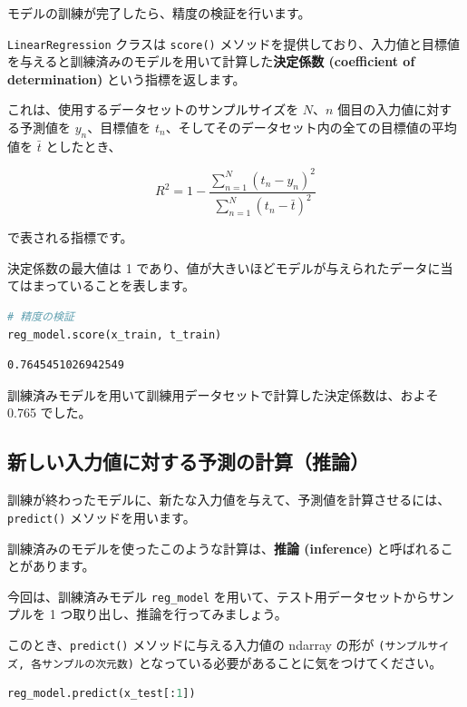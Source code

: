 モデルの訓練が完了したら、精度の検証を行います。

\texttt{LinearRegression} クラスは \texttt{score()} メソッドを提供しており、入力値と目標値を与えると訓練済みのモデルを用いて計算した\textbf{決定係数 (coefficient of determination)} という指標を返します。


これは、使用するデータセットのサンプルサイズを $N$、$n$ 個目の入力値に対する予測値を $y_{n}$、目標値を $t_n$、そしてそのデータセット内の全ての目標値の平均値を $\bar{t}$ としたとき、


\[
R^{2} = 1 - \dfrac{\sum_{n=1}^{N}\left( t_{n} - y_{n} \right)^{2}}{\sum_{n=1}^{N}\left( t_{n} - \bar{t} \right)^{2}}
\]


で表される指標です。


決定係数の最大値は 1 であり、値が大きいほどモデルが与えられたデータに当てはまっていることを表します。


\begin{lstlisting}[style=codecell,language=Python]
# 精度の検証
reg_model.score(x_train, t_train)
\end{lstlisting}

\begin{lstlisting}[style=outputcell]
0.7645451026942549
\end{lstlisting}

訓練済みモデルを用いて訓練用データセットで計算した決定係数は、およそ 0.765 でした。


\subsection{新しい入力値に対する予測の計算（推論）}


訓練が終わったモデルに、新たな入力値を与えて、予測値を計算させるには、\texttt{predict()} メソッドを用います。

訓練済みのモデルを使ったこのような計算は、\textbf{推論 (inference)} と呼ばれることがあります。

今回は、訓練済みモデル \texttt{reg\_model} を用いて、テスト用データセットからサンプルを 1 つ取り出し、推論を行ってみましょう。

このとき、\texttt{predict()} メソッドに与える入力値の ndarray の形が \texttt{(サンプルサイズ, 各サンプルの次元数)} となっている必要があることに気をつけてください。


\begin{lstlisting}[style=codecell,language=Python]
reg_model.predict(x_test[:1])
\end{lstlisting}

